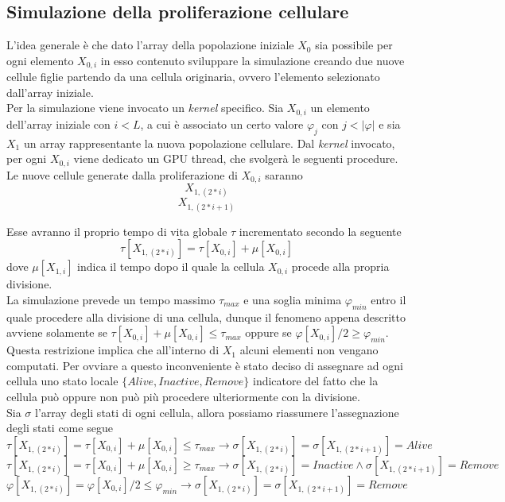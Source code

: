 \subsection{Simulazione della proliferazione cellulare}

L'idea generale è che dato l'array della popolazione iniziale $X_{0}$
sia possibile per ogni elemento $X_{0,i}$ in esso contenuto sviluppare
la simulazione creando due nuove cellule figlie partendo da una cellula
originaria, ovvero l'elemento selezionato dall'array iniziale.
\\
Per la simulazione viene invocato un \textit{kernel} specifico.
Sia $X_{0,i}$ un elemento dell'array iniziale
con $i < L$, a cui è associato un certo valore $\varphi_{j}$
con $j < |\varphi|$ e sia $X_{1}$ un array rappresentante la nuova
popolazione cellulare.
Dal \textit{kernel} invocato, per ogni $X_{0,i}$ viene dedicato un GPU thread,
che svolgerà le seguenti procedure.
\\
Le nuove cellule generate dalla proliferazione
di $X_{0, i}$ saranno $$X_{1, (2 * i)}$$ $$X_{1, (2 * i + 1)}$$

Esse avranno il proprio tempo di vita globale $\tau$
incrementato secondo la seguente
$$\tau[X_{1, (2 * i)}] = \tau[X_{0, i}] + \mu[X_{0, i}]$$
dove $\mu[X_{1, i}]$ indica il tempo dopo il quale la cellula $X_{0,i}$
procede alla propria divisione.
\\
La simulazione prevede un tempo massimo $\tau_{max}$ e una soglia minima
$\varphi_{min}$ entro il quale procedere
alla divisione di una cellula, dunque il fenomeno appena descritto avviene
solamente se $\tau[X_{0, i}] + \mu[X_{0, i}] \leqslant \tau_{max}$ oppure se
$\varphi[X_{0, i}] / 2 \geqslant \varphi_{min}$.
Questa restrizione implica che all'interno di $X_{1}$ alcuni elementi non
vengano computati. Per ovviare a questo inconveniente è stato deciso di
assegnare ad ogni cellula uno stato locale $\{Alive, Inactive, Remove\}$
indicatore del fatto che la cellula
può oppure non può più procedere ulteriormente con la divisione.
\\
Sia $\sigma$ l'array degli stati di ogni cellula, allora possiamo riassumere
l'assegnazione degli stati come segue
$$\tau[X_{1, (2 * i)}] = \tau[X_{0, i}] + \mu[X_{0, i}] \leqslant \tau_{max}
\longrightarrow \sigma[X_{1, (2 * i)}] = \sigma[X_{1, (2 * i + 1)}] = Alive$$
$$\tau[X_{1, (2 * i)}] = \tau[X_{0, i}] + \mu[X_{0, i}] \geqslant \tau_{max}
\longrightarrow \sigma[X_{1, (2 * i)}] = Inactive \land
\sigma[X_{1, (2 * i + 1)}] = Remove$$
$$\varphi[X_{1, (2 * i)}] = \varphi[X_{0, i}] / 2 \leqslant \varphi_{min}
\longrightarrow \sigma[X_{1, (2 * i)}] = \sigma[X_{1, (2 * i + 1)}] = Remove$$

